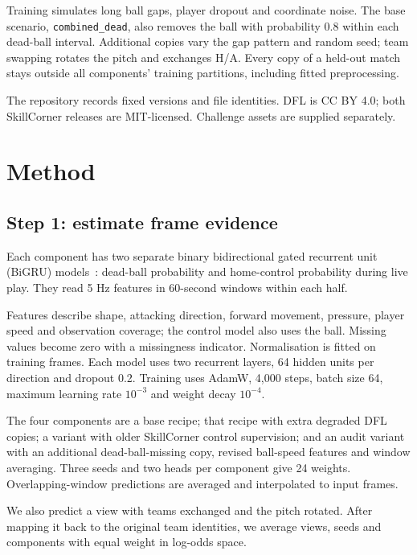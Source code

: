 \documentclass[conference,a4paper]{IEEEtran}
\begin{document}
Training simulates long ball gaps, player dropout and coordinate noise. The
base scenario, \texttt{combined\_dead}, also removes the ball with probability
0.8 within each dead-ball interval. Additional copies vary the gap pattern and
random seed; team swapping rotates the pitch and exchanges H/A. Every copy of a
held-out match stays outside all components' training partitions, including
fitted preprocessing.

The repository records fixed versions and file identities. DFL is CC BY 4.0;
both SkillCorner releases are MIT-licensed. Challenge assets are supplied
separately.

\section{Method}
\subsection{Step 1: estimate frame evidence}
Each component has two separate binary bidirectional gated recurrent unit
(BiGRU) models~\cite{cho2014}: dead-ball probability and home-control probability
during live play. They read 5 Hz features in 60-second windows within each half.

Features describe shape, attacking direction, forward movement, pressure,
player speed and observation coverage; the control model also uses the ball.
Missing values become zero with a missingness indicator. Normalisation is
fitted on training frames. Each model uses two recurrent layers, 64 hidden
units per direction and dropout 0.2. Training uses AdamW, 4,000 steps, batch size
64, maximum learning rate $10^{-3}$ and weight decay $10^{-4}$.

The four components are a base recipe; that recipe with extra degraded DFL
copies; a variant with older SkillCorner control supervision; and an audit
variant with an additional dead-ball-missing copy, revised ball-speed features and
window averaging. Three seeds and two heads per component give 24 weights.
Overlapping-window predictions are averaged and interpolated to input frames.

We also predict a view with teams exchanged and the pitch rotated. After
mapping it back to the original team identities, we average views, seeds and
components with equal weight in log-odds space.
\end{document}
